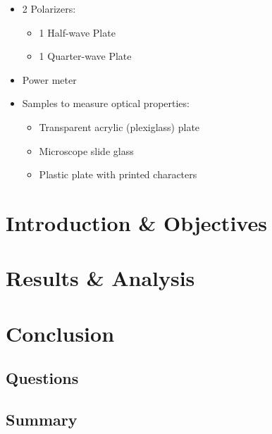 \documentclass[
	letterpaper, %
	10pt, %
]{CSUniSchoolLabReport}
\begin{document}
\begin{itemize}

  \item 2 Polarizers:

    \begin{itemize}

      \item 1 Half-wave Plate

      \item 1 Quarter-wave Plate

    \end{itemize}

  \item Power meter

  \item Samples to measure optical properties:

    \begin{itemize}

      \item Transparent acrylic (plexiglass) plate

      \item Microscope slide glass

      \item Plastic plate with printed characters

    \end{itemize}

\end{itemize}

\section{Introduction \& Objectives}

\section{Results \& Analysis} 

\section{Conclusion}

\subsection{Questions}

\subsection{Summary}
\end{document}
